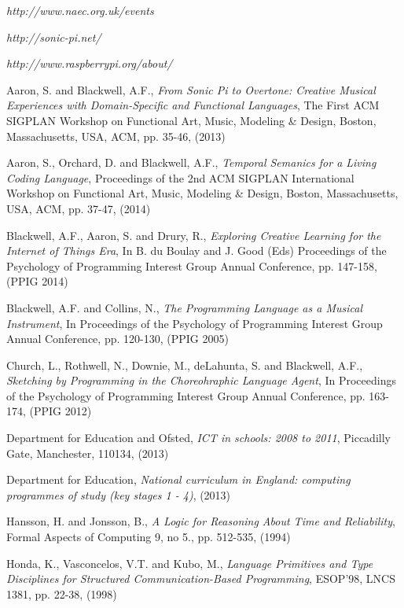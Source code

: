\documentclass[11pt]{scrartcl}
\begin{document}
\begin{thebibliography}{9}

  \emph{http://www.naec.org.uk/events}

  \emph{http://sonic-pi.net/}

  \emph{http://www.raspberrypi.org/about/}

  Aaron, S. and Blackwell, A.F.,
  \emph{From Sonic Pi to Overtone: Creative Musical Experiences with Domain-Specific and Functional Languages},
  The First ACM SIGPLAN Workshop on Functional Art, Music, Modeling \& Design,
  Boston, Massachusetts, USA,
  ACM, pp. 35-46,
  (2013)

  Aaron, S., Orchard, D. and Blackwell, A.F.,
  \emph{Temporal Semanics for a Living Coding Language},
  Proceedings of the 2nd ACM SIGPLAN International Workshop on Functional Art, Music, Modeling \& Design,
  Boston, Massachusetts, USA,
  ACM, pp. 37-47,
  (2014)

  Blackwell, A.F., Aaron, S. and Drury, R., 
  \emph{Exploring Creative Learning for the Internet of Things Era},
  In B. du Boulay and J. Good (Eds) Proceedings of the Psychology of Programming Interest Group Annual Conference, 
  pp. 147-158,
  (PPIG 2014)

  Blackwell, A.F. and Collins, N.,
  \emph{The Programming Language as a Musical Instrument},
  In Proceedings of the Psychology of Programming Interest Group Annual Conference,
  pp. 120-130,
  (PPIG 2005)

  Church, L., Rothwell, N., Downie, M., deLahunta, S. and Blackwell, A.F.,
  \emph{Sketching by Programming in the Choreohraphic Language Agent},
  In Proceedings of the Psychology of Programming Interest Group Annual Conference,
  pp. 163-174,
  (PPIG 2012)

  Department for Education and Ofsted,
  \emph{ICT in schools: 2008 to 2011},
  Piccadilly Gate,
  Manchester,
  110134,
  (2013)

  Department for Education,
  \emph{National curriculum in England: computing programmes of study (key stages 1 - 4)},
  (2013)

  Hansson, H. and Jonsson, B.,
  \emph{A Logic for Reasoning About Time and Reliability},
  Formal Aspects of Computing 9,
  no 5., pp. 512-535,
  (1994)

  Honda, K., Vasconcelos, V.T. and Kubo, M.,
  \emph{Language Primitives and Type Disciplines for Structured Communication-Based Programming},
  ESOP'98, LNCS 1381,
  pp. 22-38,
  (1998)


\end{thebibliography}
\end{document}
